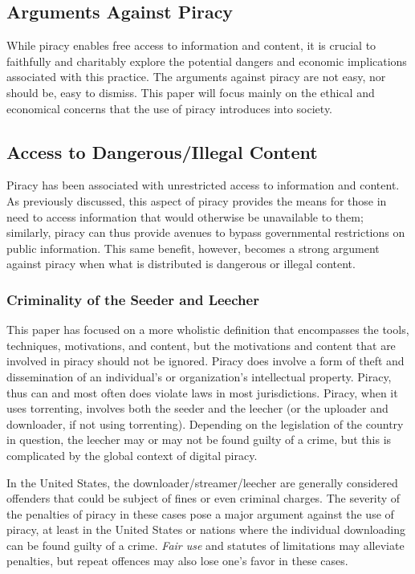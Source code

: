 \documentclass[onecolumn, 12pt]{article}
\begin{document}
\begin{refsection}
\section{Arguments Against Piracy}
While piracy enables free access to information and content, it is crucial to
faithfully and charitably explore the potential dangers and economic
implications associated with this practice. The arguments against piracy are
not easy, nor should be, easy to dismiss. This paper will focus mainly on the
ethical and economical concerns that the use of piracy introduces into society.

\subsection{Access to Dangerous/Illegal Content}
Piracy has been associated with unrestricted access to information and
content. As previously discussed, this aspect of piracy provides the means for
those in need to access information that would otherwise be unavailable to them;
similarly, piracy can thus provide avenues to bypass governmental restrictions
on public information. This same benefit, however, becomes a strong argument
against piracy when what is distributed is dangerous or illegal content.

\subsubsection{Criminality of the Seeder and Leecher}
This paper has focused on a more wholistic definition that encompasses
the tools, techniques, motivations, and content, but the motivations and
content that are involved in piracy should not be ignored. Piracy does involve
a form of theft and dissemination of an individual's or organization's
intellectual property. Piracy, thus can and most often does violate laws in
most jurisdictions. Piracy, when it uses torrenting, involves both the
seeder and the leecher (or the uploader and downloader, if not using torrenting).
Depending on the legislation of the country in question, the leecher may or
may not be found guilty of a crime, but this is complicated by the global
context of digital piracy.

In the United States, the downloader/streamer/leecher are generally considered
offenders that could be subject of fines or even criminal charges. The severity
of the penalties of piracy in these cases pose a major argument against the use
of piracy, at least in the United States or nations where the individual
downloading can be found guilty of a crime. \emph{Fair use} and statutes of
limitations may alleviate penalties, but repeat offences may also lose one's
favor in these cases.~\cite{felonies.org}


\end{refsection}
\end{document}
